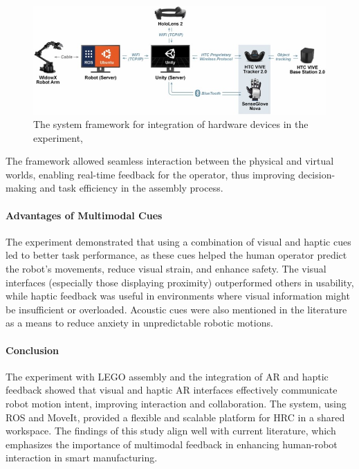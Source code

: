 \begin{enumerate}
\begin{figure}[!htpb]
    \centering
    \includegraphics[width=0.6\linewidth]{figs/system-framework.jpg}
    \caption{The system framework for integration of hardware devices in the experiment, \cite{CHU2023313}}
    \label{f:system-framework}
\end{figure}

The framework allowed seamless interaction between the physical and virtual worlds, enabling real-time feedback for the operator, thus improving decision-making and task efficiency in the assembly process.

\paragraph{Advantages of Multimodal Cues}
The experiment demonstrated that using a combination of visual and haptic cues led to better task performance, as these cues helped the human operator predict the robot's movements, reduce visual strain, and enhance safety. The visual interfaces (especially those displaying proximity) outperformed others in usability, while haptic feedback was useful in environments where visual information might be insufficient or overloaded. Acoustic cues were also mentioned in the literature as a means to reduce anxiety in unpredictable robotic motions.

\paragraph{Conclusion}
The experiment with LEGO assembly and the integration of \ac{AR} and haptic feedback showed that visual and haptic \ac{AR} interfaces effectively communicate robot motion intent, improving interaction and collaboration. The system, using ROS and MoveIt, provided a flexible and scalable platform for HRC in a shared workspace. The findings of this study align well with current literature, which emphasizes the importance of multimodal feedback in enhancing human-robot interaction in smart manufacturing.



\end{enumerate}
